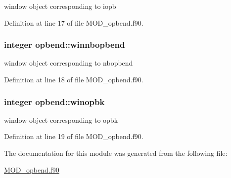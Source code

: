window object corresponding to iopb 



Definition at line 17 of file M\-O\-D\-\_\-opbend.\-f90.

\hypertarget{classopbend_ae748e888973e590e2129f8f875a3129c}{
\subsubsection[{winnbopbend}]{\setlength{\rightskip}{0pt plus 5cm}integer opbend\-::winnbopbend}}\label{classopbend_ae748e888973e590e2129f8f875a3129c}


window object corresponding to nbopbend 



Definition at line 18 of file M\-O\-D\-\_\-opbend.\-f90.

\hypertarget{classopbend_afec81e6108d178f247fe889ad1571bf3}{
\subsubsection[{winopbk}]{\setlength{\rightskip}{0pt plus 5cm}integer opbend\-::winopbk}}\label{classopbend_afec81e6108d178f247fe889ad1571bf3}


window object corresponding to opbk 



Definition at line 19 of file M\-O\-D\-\_\-opbend.\-f90.



The documentation for this module was generated from the following file\-:\begin{DoxyCompactItemize}
\item 
\hyperlink{MOD__opbend_8f90}{M\-O\-D\-\_\-opbend.\-f90}\end{DoxyCompactItemize}
